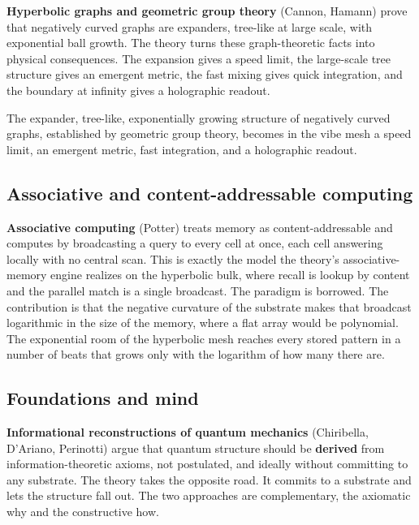 \textbf{Hyperbolic graphs and geometric group theory} (Cannon, Hamann) prove that negatively curved graphs are expanders, tree-like at large scale, with exponential ball growth. The theory turns these graph-theoretic facts into physical consequences. The expansion gives a speed limit, the large-scale tree structure gives an emergent metric, the fast mixing gives quick integration, and the boundary at infinity gives a holographic readout.

\begin{proposition}
The expander, tree-like, exponentially growing structure of negatively curved graphs, established by geometric group theory, becomes in the vibe mesh a speed limit, an emergent metric, fast integration, and a holographic readout.
\end{proposition}

\subsection{Associative and content-addressable computing}

\textbf{Associative computing} (Potter) treats memory as content-addressable and computes by broadcasting a query to every cell at once, each cell answering locally with no central scan. This is exactly the model the theory's associative-memory engine realizes on the hyperbolic bulk, where recall is lookup by content and the parallel match is a single broadcast. The paradigm is borrowed. The contribution is that the negative curvature of the substrate makes that broadcast logarithmic in the size of the memory, where a flat array would be polynomial. The exponential room of the hyperbolic mesh reaches every stored pattern in a number of beats that grows only with the logarithm of how many there are.

\subsection{Foundations and mind}

\textbf{Informational reconstructions of quantum mechanics} (Chiribella, D'Ariano, Perinotti) argue that quantum structure should be \textbf{derived} from information-theoretic axioms, not postulated, and ideally without committing to any substrate. The theory takes the opposite road. It commits to a substrate and lets the structure fall out. The two approaches are complementary, the axiomatic why and the constructive how.

